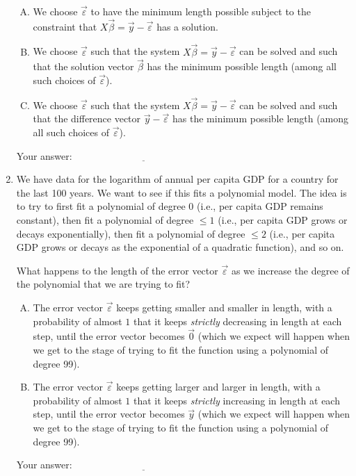 \documentclass[10pt]{amsart}
\begin{document}
\begin{enumerate}
  \begin{enumerate}[(A)]
  \item We choose $\vec{\varepsilon}$ to have the minimum length
    possible subject to the constraint that $X\vec{\beta} = \vec{y} -
    \vec{\varepsilon}$ has a solution.
  \item We choose $\vec{\varepsilon}$ such that the system
    $X\vec{\beta} = \vec{y} - \vec{\varepsilon}$ can be solved and
    such that the solution vector $\vec{\beta}$ has the minimum
    possible length (among all such choices of $\vec{\varepsilon}$).
  \item We choose $\vec{\varepsilon}$ such that the system
    $X\vec{\beta} = \vec{y} - \vec{\varepsilon}$ can be solved and
    such that the difference vector $\vec{y} - \vec{\varepsilon}$ has
    the minimum possible length (among all such choices of
    $\vec{\varepsilon}$).
  \end{enumerate}

  \vspace{0.1in}
  Your answer: $\underline{\qquad\qquad\qquad\qquad\qquad\qquad\qquad}$
  \vspace{0.1in}

\item We have data for the logarithm of annual per capita GDP for a
  country for the last 100 years. We want to see if this fits a
  polynomial model. The idea is to try to first fit a polynomial of
  degree $0$ (i.e., per capita GDP remains constant), then fit a
  polynomial of degree $\le 1$ (i.e., per capita GDP grows or decays
  exponentially), then fit a polynomial of degree $\le 2$ (i.e., per
  capita GDP grows or decays as the exponential of a quadratic
  function), and so on.

  What happens to the length of the error vector $\vec{\varepsilon}$ as
  we increase the degree of the polynomial that we are trying to fit?

  \begin{enumerate}[(A)]
  \item The error vector $\vec{\varepsilon}$ keeps getting smaller and
    smaller in length, with a probability of almost $1$ that it keeps
    {\em strictly} decreasing in length at each step, until the error
    vector becomes $\vec{0}$ (which we expect will happen when we get
    to the stage of trying to fit the function using a polynomial of
    degree 99).
  \item The error vector $\vec{\varepsilon}$ keeps getting larger and
    larger in length, with a probability of almost $1$ that it keeps
    {\em strictly} increasing in length at each step, until the error
    vector becomes $\vec{y}$ (which we expect will happen when we get
    to the stage of trying to fit the function using a polynomial of
    degree 99).
  \end{enumerate}

  \vspace{0.1in}
  Your answer: $\underline{\qquad\qquad\qquad\qquad\qquad\qquad\qquad}$
  \vspace{0.1in}
\end{enumerate}
\end{document}
